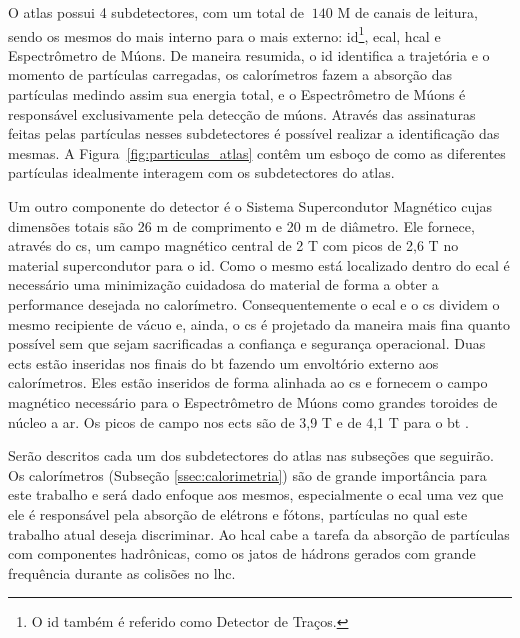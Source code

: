 O \gls{atlas} possui 4 subdetectores, com um total de $~140$ M de canais de
leitura, sendo os mesmos do mais interno para o mais externo: 
\gls{id}\footnote{O \gls{id} também é referido como Detector de Traços.}, \gls{ecal}, 
\gls{hcal} e Espectrômetro de Múons. De maneira resumida, o \gls{id} identifica a
trajetória e o momento de partículas carregadas, os calorímetros fazem a
absorção das partículas medindo assim sua energia total, e o Espectrômetro de
Múons é responsável exclusivamente pela detecção de múons.
Através das assinaturas feitas pelas partículas nesses 
subdetectores é possível realizar a identificação das mesmas. 
A Figura~\ref{fig:particulas_atlas} contêm um esboço de como as diferentes 
partículas idealmente interagem com os subdetectores do \gls{atlas}. 


Um outro componente do detector é o Sistema Supercondutor Magnético cujas
dimensões totais são 26 m de comprimento e 20 m de diâmetro. 
Ele fornece, através do \gls{cs}, um campo magnético central de 2 T com picos de 2,6 T 
no material supercondutor para o \gls{id}. Como o mesmo está
localizado dentro do \gls{ecal} é necessário uma minimização cuidadosa do
material de forma a obter a performance desejada no calorímetro. 
Consequentemente o \gls{ecal} e o \gls{cs} dividem o mesmo recipiente de vácuo e,
ainda, o \gls{cs} é projetado da maneira mais fina quanto possível sem que sejam
sacrificadas a confiança e segurança operacional.
Duas \glspl{ect} estão inseridas nos finais do \gls{bt} fazendo um
envoltório externo aos calorímetros. Eles estão inseridos de forma alinhada ao \gls{cs} 
e fornecem o campo magnético necessário para o Espectrômetro de Múons como grandes toroides 
de núcleo a ar. Os picos de campo nos \glspl{ect} são de
3,9 T e de 4,1 T para o \gls{bt} \cite{ATLAS_TDR}.

Serão descritos cada um dos subdetectores do \gls{atlas} nas
subseções que seguirão. Os calorímetros (Subseção \ref{ssec:calorimetria}) são de grande importância 
para este trabalho e será dado enfoque aos mesmos, 
especialmente o \gls{ecal} uma vez que ele é responsável 
pela absorção de elétrons e fótons, partículas no qual este trabalho atual deseja
discriminar. Ao \gls{hcal} cabe a tarefa da absorção de partículas
com componentes hadrônicas, como os jatos de hádrons gerados com grande
frequência durante as colisões no \gls{lhc}.

